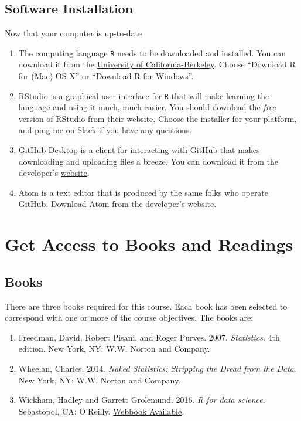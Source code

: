 \documentclass[]{book}
\theoremstyle{definition}
\theoremstyle{definition}
\theoremstyle{definition}
\theoremstyle{remark}
\begin{document}
\subsection{Software Installation}\label{software-installation}

Now that your computer is up-to-date

\begin{enumerate}
\def\labelenumi{\arabic{enumi}.}
\item
  The computing language \texttt{R} needs to be downloaded and
  installed. You can download it from the
  \href{https://cran.cnr.berkeley.edu}{University of
  California-Berkeley}. Choose ``Download R for (Mac) OS X'' or
  ``Download R for Windows''.
\item
  RStudio is a graphical user interface for \texttt{R} that will make
  learning the language and using it much, much easier. You should
  download the \emph{free} version of RStudio from
  \href{https://www.rstudio.com/products/rstudio/download/\#download}{their
  website}. Choose the installer for your platform, and ping me on Slack
  if you have any questions.
\item
  GitHub Desktop is a client for interacting with GitHub that makes
  downloading and uploading files a breeze. You can download it from the
  developer's \href{http://desktop.github.com}{website}.
\item
  Atom is a text editor that is produced by the same folks who operate
  GitHub. Download Atom from the developer's
  \href{http://atom.io}{website}.
\end{enumerate}

\section{Get Access to Books and
Readings}\label{get-access-to-books-and-readings}

\subsection{Books}\label{books}

There are three books required for this course. Each book has been
selected to correspond with one or more of the course objectives. The
books are:

\begin{enumerate}
\def\labelenumi{\arabic{enumi}.}
\item
  Freedman, David, Robert Pisani, and Roger Purves. 2007.
  \emph{Statistics}. 4th edition. New York, NY: W.W. Norton and Company.
\item
  Wheelan, Charles. 2014. \emph{Naked Statistics: Stripping the Dread
  from the Data}. New York, NY: W.W. Norton and Company.
\item
  Wickham, Hadley and Garrett Grolemund. 2016. \emph{R for data
  science}. Sebastopol, CA: O'Reilly.
  \href{http://r4ds.had.co.nz}{Webbook Available}.
\end{enumerate}
\end{document}

